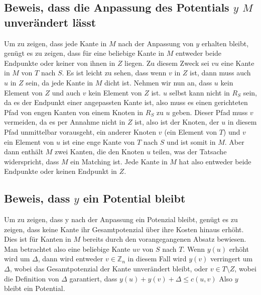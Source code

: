 \subsection{Beweis, dass die Anpassung des Potentials $y$ $M$ unverändert lässt
\label{munkres:subsection:malorum}}
Um zu zeigen, dass jede Kante in $M$ nach der Anpassung von $y$
erhalten bleibt, genügt es zu zeigen, dass für eine beliebige Kante
in $M$ entweder beide Endpunkte oder keiner von ihnen in $Z$ liegen.
Zu diesem Zweck sei $vu$ eine Kante in $M$ von $T$ nach $S$.
Es ist leicht zu sehen, dass wenn $v$ in $Z$ ist, dann muss auch
$u$ in $Z$ sein, da jede Kante in $M$ dicht ist.
Nehmen wir nun an, dass $u$ kein Element von $Z$ und auch $v$ kein
Element von $Z$ ist.
$u$ selbst kann nicht in $R_{S}$ sein, da es der Endpunkt einer
angepassten Kante ist, also muss es einen gerichteten Pfad von engen
Kanten von einem Knoten in $R_{S}$ zu $u$ geben.
Dieser Pfad muss $v$ vermeiden, da es per Annahme nicht in $Z$ ist,
also ist der Knoten, der $u$ in diesem Pfad unmittelbar vorausgeht,
ein anderer Knoten $v$ (ein Element von $T$) und $v$ ein Element
von $u$ ist eine enge Kante von $T$ nach $S$ und ist somit in $M$.
Aber dann enthält $M$ zwei Kanten, die den Knoten $u$ teilen, was
der Tatsache widerspricht, dass $M$ ein Matching ist.
Jede Kante in $M$ hat also entweder beide Endpunkte oder keinen
Endpunkt in $Z$.

\subsection{Beweis, dass $y$ ein Potential bleibt
\label{munkres:subsection:malorum}}
Um zu zeigen, dass y nach der Anpassung ein Potenzial bleibt, genügt
es zu zeigen, dass keine Kante ihr Gesamtpotenzial über ihre Kosten
hinaus erhöht.
Dies ist für Kanten in $M$ bereits durch den vorangegangenen Absatz
bewiesen.
Man betrachtet also eine beliebige Kante $uv$ von $S$ nach $T$.
Wenn $y(u)$ erhöht wird um $\Delta$, dann wird entweder $v\in
\mathbb{Z}_n$ in diesem Fall wird $y(v)$ verringert um $\Delta$,
wobei das Gesamtpotenzial der Kante unverändert bleibt, oder $v\in
T\setminus Z$, wobei die Definition von $\Delta$ garantiert, dass
$y(u)+y(v)+\Delta \le c(u,v)$
Also $y$ bleibt ein Potential.

